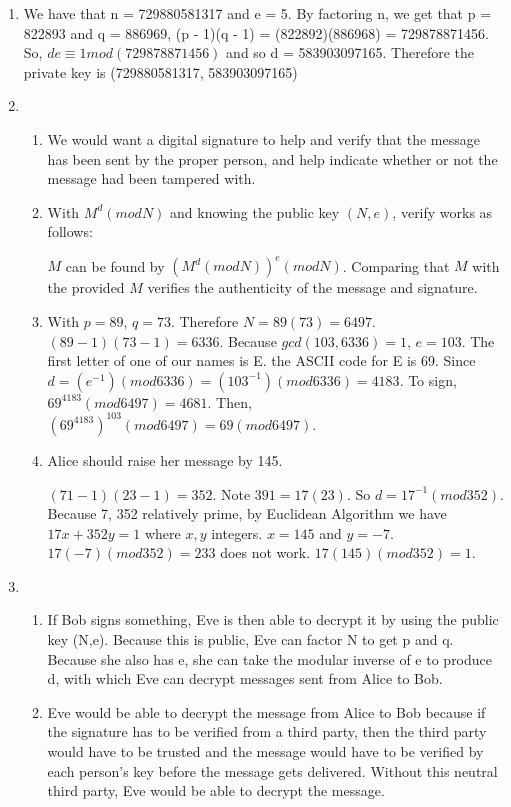 \documentclass[12pt,letterpaper]{article}
\begin{document}
\begin{enumerate}
        \item %
        We have that n = 729880581317 and e = 5. By factoring n, we get that p = 822893 and q = 886969, (p - 1)(q - 1) = (822892)(886968) = 729878871456. So, $de \equiv 1 mod(729878871456)$ and so d = 583903097165. Therefore the private key is (729880581317, 583903097165)
            
        \item %
        \begin{enumerate}
        \item %
        We would want a digital signature to help and verify that the message has been sent by the proper person, and help indicate whether or not the message had been tampered with.
        
        \item %
        With $M^d (mod N)$ and knowing the public key $(N, e)$, verify works as follows:
        
        $M$ can be found by $(M^d (mod N))^e(mod N)$. Comparing that $M$ with the provided $M$ verifies the authenticity of the message and signature. 
        
        \item %
        With $p = 89$, $q = 73$. Therefore $N = 89(73) = 6497$. $(89-1)(73-1) = 6336$. Because $gcd(103, 6336) = 1$, $e = 103$. The first letter of one of our names is E. the ASCII code for E is 69. Since $d = (e^{-1})(mod  6336)= (103^{-1})(mod  6336)=4183$. To sign, $69^{4183}(mod 6497) = 4681$. Then, $(69^{4183})^{103}(mod 6497) = 69(mod 6497)$.
        
        \item %
        Alice should raise her message by 145.
        
        $(71-1)(23-1) = 352$. Note $391 = 17(23)$. So $d= 17^{-1} (mod 352)$. Because 7, 352 relatively prime, by Euclidean Algorithm we have $17x + 352y = 1$ where $x, y$ integers. $x = 145$ and $y = -7$. $17(-7) (mod 352) = 233$ does not work. $17(145) (mod 352) = 1$.
        \end{enumerate}
            
        \item %
        \begin{enumerate}
        \item
        If Bob signs something, Eve is then able to decrypt it by using the public key (N,e). Because this is public, Eve can factor N to get p and q. Because she also has e, she can take the modular inverse of e to produce d, with which Eve can decrypt messages sent from Alice to Bob.
        \item
        Eve would be able to decrypt the message from Alice to Bob because if the signature has to be verified from a third party, then the third party would have to be trusted and the message would have to be verified by each person's key before the message gets delivered. Without this neutral third party, Eve would be able to decrypt the message.
        \end{enumerate}
        

\end{enumerate}
\end{document}
